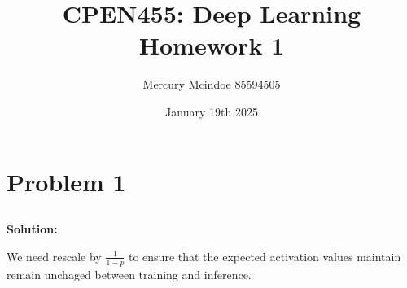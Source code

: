 \documentclass{article}
\title{CPEN455: Deep Learning \\ Homework 1}
\author{Mercury Mcindoe 85594505}
\date{January 19th 2025}
\newenvironment{solution}
  {\par\noindent\textbf{Solution:}\par}
  {\par}
\begin{document}
\pagestyle{fancy}
\fancyhead{} %

\maketitle
\thispagestyle{fancy}


\section{Problem 1}
\subsection{}
\begin{solution}

  We need rescale by $\frac{1}{1-p}$ to ensure that the expected activation values maintain remain unchaged between training and inference.

\end{solution}
\end{document}
